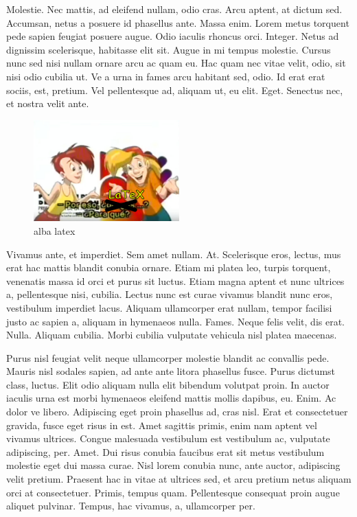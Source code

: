 \documentclass[a5paper,10pt,twocolumn,twoside]{book}
\begin{document}
Molestie. Nec mattis, ad eleifend nullam, odio cras. Arcu aptent, at dictum sed. Accumsan, netus a posuere id phasellus ante. Massa enim. Lorem metus torquent pede sapien feugiat posuere augue. Odio iaculis rhoncus orci. Integer. Netus ad dignissim scelerisque, habitasse elit sit. Augue in mi tempus molestie. Cursus nunc sed nisi nullam ornare arcu ac quam eu. Hac quam nec vitae velit, odio, sit nisi odio cubilia ut. Ve a urna in fames arcu habitant sed, odio. Id erat erat sociis, est, pretium. Vel pellentesque ad, aliquam ut, eu elit. Eget. Senectus nec, et nostra velit ante.
\begin{figure}
  \begin{center}
    \includegraphics[width=0.5\textwidth]{img/fleco_y_male_latex.png}
    \caption{alba latex}
    \label{fig:}
  \end{center}
\end{figure}
Vivamus ante, et imperdiet. Sem amet nullam. At. Scelerisque eros, lectus, mus erat hac mattis blandit conubia ornare. Etiam mi platea leo, turpis torquent, venenatis massa id orci et purus sit luctus. Etiam magna aptent et nunc ultrices a, pellentesque nisi, cubilia. Lectus nunc est curae vivamus blandit nunc eros, vestibulum imperdiet lacus. Aliquam ullamcorper erat nullam, tempor facilisi justo ac sapien a, aliquam in hymenaeos nulla. Fames. Neque felis velit, dis erat. Nulla. Aliquam cubilia. Morbi cubilia vulputate vehicula nisl platea maecenas.

Purus nisl feugiat velit neque ullamcorper molestie blandit ac convallis pede. Mauris nisl sodales sapien, ad ante ante litora phasellus fusce. Purus dictumst class, luctus. Elit odio aliquam nulla elit bibendum volutpat proin. In auctor iaculis urna est morbi hymenaeos eleifend mattis mollis dapibus, eu. Enim. Ac dolor ve libero. Adipiscing eget proin phasellus ad, cras nisl. Erat et consectetuer gravida, fusce eget risus in est. Amet sagittis primis, enim nam aptent vel vivamus ultrices. Congue malesuada vestibulum est vestibulum ac, vulputate adipiscing, per. Amet. Dui risus conubia faucibus erat sit metus vestibulum molestie eget dui massa curae. Nisl lorem conubia nunc, ante auctor, adipiscing velit pretium. Praesent hac in vitae at ultrices sed, et arcu pretium netus aliquam orci at consectetuer. Primis, tempus quam. Pellentesque consequat proin augue aliquet pulvinar. Tempus, hac vivamus, a, ullamcorper per.
\end{document}
